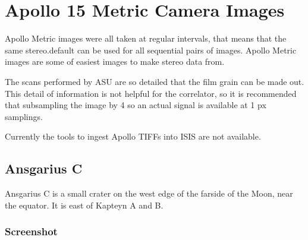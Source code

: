 \section{Apollo 15 Metric Camera Images}

Apollo Metric images were all taken at regular intervals, that means
that the same stereo.default can be used for all sequential pairs of
images. Apollo Metric images are some of easiest images to make stereo
data from.

The scans performed by ASU are so detailed that the film grain can be
made out. This detail of information is not helpful for the
correlator, so it is recommended that subsampling the image by 4 so an
actual signal is available at 1 px samplings.

Currently the tools to ingest Apollo TIFFs into ISIS are not
available.

\subsection{Ansgarius C}

Ansgarius C is a small crater on the west edge of the farside of the
Moon, near the equator. It is east of Kapteyn A and B.

\subsubsection*{Screenshot}


